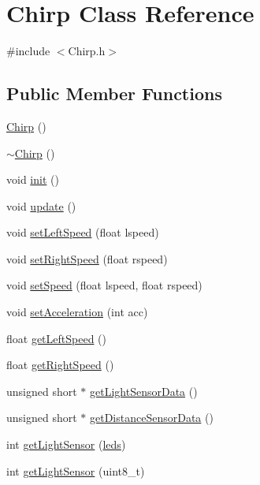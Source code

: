 \hypertarget{class_chirp}{\section{Chirp Class Reference}
\label{class_chirp}
}


{\ttfamily \#include $<$Chirp.\-h$>$}

\subsection*{Public Member Functions}
\begin{DoxyCompactItemize}
\item 
\hyperlink{class_chirp_adb5f9d25d80d54ca8edc930a7e62ce95}{Chirp} ()
\item 
\hyperlink{class_chirp_a16175ededbf308e7e2013f48281e28ae}{$\sim$\-Chirp} ()
\item 
void \hyperlink{class_chirp_aeeab19655334edc5df9fe16d41fc8603}{init} ()
\item 
void \hyperlink{class_chirp_aad6bc3e54a01c0f4cb7ddd2e1e45b318}{update} ()
\item 
void \hyperlink{class_chirp_a3ad23126a33b274e60e109333ba31fe9}{set\-Left\-Speed} (float lspeed)
\item 
void \hyperlink{class_chirp_af022256f0e4bb2b6eeffb6d706703d3f}{set\-Right\-Speed} (float rspeed)
\item 
void \hyperlink{class_chirp_a59eec2a11e79e12d6acc0aa1178f0864}{set\-Speed} (float lspeed, float rspeed)
\item 
void \hyperlink{class_chirp_af1cb7630df8d64d13945b8de3aafc134}{set\-Acceleration} (int acc)
\item 
float \hyperlink{class_chirp_ab151f9ab509643d438b0a54a595c297c}{get\-Left\-Speed} ()
\item 
float \hyperlink{class_chirp_a5f6d28826cec7bdecc2a01e3d8f1606f}{get\-Right\-Speed} ()
\item 
unsigned short $\ast$ \hyperlink{class_chirp_a3c381d01d56cee50e05dd3e33c936aa1}{get\-Light\-Sensor\-Data} ()
\item 
unsigned short $\ast$ \hyperlink{class_chirp_a651d2afb0bb8354b282b664caea7eb34}{get\-Distance\-Sensor\-Data} ()
\item 
int \hyperlink{class_chirp_ad527a51cbe4419b040977bc8c258d328}{get\-Light\-Sensor} (\hyperlink{_chirp_8h_a840c9267db46ce0db0f44d473c562e66}{leds})
\item 
int \hyperlink{class_chirp_ac8ca7ed00220a3074ad0e95d7cc60536}{get\-Light\-Sensor} (uint8\-\_\-t)

\end{DoxyCompactItemize}
